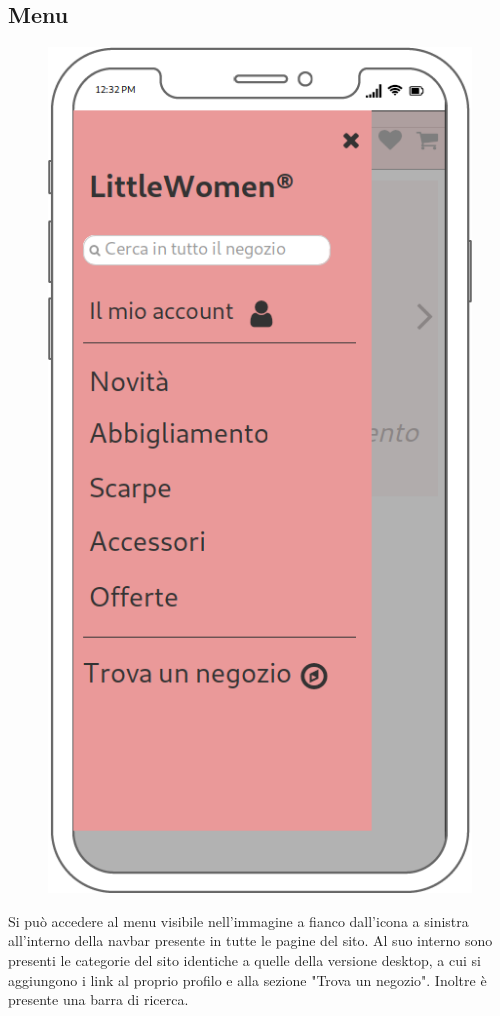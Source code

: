 \documentclass[12pt,a4paper]{report}
\begin{document}
\subsection{Menu}
\begin{figure}
\centering
\includegraphics[height=0.38\textheight]{"Project Management Sources/Wireframe/WireFrame Screenshot/Mobile/Home menu"}
\vspace{-30pt}
\end{figure}
\vspace{5mm}
Si può accedere al menu visibile nell'immagine a fianco dall'icona a sinistra all'interno della navbar presente in tutte le pagine del sito. Al suo interno sono presenti le categorie del sito identiche a quelle della versione desktop, a cui si aggiungono i link al proprio profilo e alla sezione "Trova un negozio". Inoltre è presente una barra di ricerca.\\\\\\\\
\end{document}
